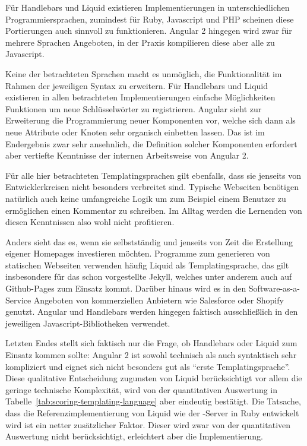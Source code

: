 Für Handlebars und Liquid existieren Implementierungen in unterschiedlichen Programmiersprachen, zumindest für Ruby, Javascript und PHP scheinen diese Portierungen auch sinnvoll zu funktionieren. Angular 2 hingegen wird zwar für mehrere Sprachen Angeboten, in der Praxis kompilieren diese aber alle zu Javascript.

Keine der betrachteten Sprachen macht es unmöglich, die Funktionalität im Rahmen der jeweiligen Syntax zu erweitern. Für Handlebars und Liquid existieren in allen betrachteten Implementierungen einfache Möglichkeiten Funktionen um neue Schlüsselwörter zu registrieren. Angular sieht zur Erweiterung die Programmierung neuer Komponenten vor, welche sich dann als neue Attribute oder Knoten sehr organisch einbetten lassen. Das ist im Endergebnis zwar sehr ansehnlich, die Definition solcher Komponenten erfordert aber vertiefte Kenntnisse der internen Arbeitsweise von Angular 2.

Für alle hier betrachteten Templatingsprachen gilt ebenfalls, dass sie jenseits von Entwicklerkreisen nicht besonders verbreitet sind. Typische Webseiten benötigen natürlich auch keine umfangreiche Logik um zum Beispiel einem Benutzer zu ermöglichen einen Kommentar zu schreiben. Im Alltag werden die Lernenden von diesen Kenntnissen also wohl nicht profitieren.

Anders sieht das es, wenn sie selbstständig und jenseits von \idename Zeit die Erstellung eigener Homepages investieren möchten. Programme zum generieren von statischen Webseiten verwenden häufig Liquid als Templatingsprache, das gilt insbesondere für das schon vorgestellte Jekyll, welches unter anderem auch auf Github-Pages zum Einsatz kommt. Darüber hinaus wird es in den Software-as-a-Service Angeboten von kommerziellen Anbietern wie Salesforce oder Shopify genutzt. Angular und Handlebars werden hingegen faktisch ausschließlich in den jeweiligen Javascript-Bibliotheken verwendet.

Letzten Endes stellt sich faktisch nur die Frage, ob Handlebars oder Liquid zum Einsatz kommen sollte: Angular 2 ist sowohl technisch als auch syntaktisch sehr kompliziert und eignet sich nicht besonders gut als "`erste Templatingsprache"'. Diese qualitative Entscheidung zugunsten von Liquid berücksichtigt vor allem die geringe technische Komplexität, wird von der quantitativen Auswertung in Tabelle~\ref{tab:scoring-templating-language} aber eindeutig bestätigt. Die Tatsache, dass die Referenzimplementierung von Liquid wie der \idename-Server in Ruby entwickelt wird ist ein netter zusätzlicher Faktor. Dieser wird zwar von der quantitativen Auswertung nicht berücksichtigt, erleichtert aber die Implementierung.

